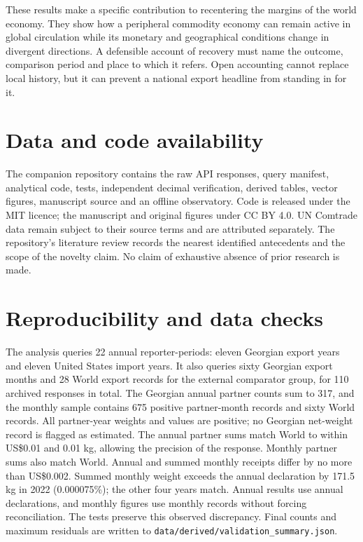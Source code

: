 \documentclass[11pt,a4paper]{article}
\begin{document}
These results make a specific contribution to recentering the margins of the world economy. They show how a peripheral commodity economy can remain active in global circulation while its monetary and geographical conditions change in divergent directions. A defensible account of recovery must name the outcome, comparison period and place to which it refers. Open accounting cannot replace local history, but it can prevent a national export headline from standing in for it.

\section*{Data and code availability}
The companion repository contains the raw API responses, query manifest, analytical code, tests, independent decimal verification, derived tables, vector figures, manuscript source and an offline observatory. Code is released under the MIT licence; the manuscript and original figures under CC BY 4.0. UN Comtrade data remain subject to their source terms and are attributed separately. The repository's literature review records the nearest identified antecedents and the scope of the novelty claim. No claim of exhaustive absence of prior research is made.

\FloatBarrier


\clearpage
\appendix
\section{Reproducibility and data checks}\label{app:validation}
The analysis queries 22 annual reporter-periods: eleven Georgian export years and eleven United States import years. It also queries sixty Georgian export months and 28 World export records for the external comparator group, for 110 archived responses in total. The Georgian annual partner counts sum to 317, and the monthly sample contains 675 positive partner-month records and sixty World records. All partner-year weights and values are positive; no Georgian net-weight record is flagged as estimated. The annual partner sums match World to within US\$0.01 and 0.01 kg, allowing the precision of the response. Monthly partner sums also match World. Annual and summed monthly receipts differ by no more than US\$0.002. Summed monthly weight exceeds the annual declaration by 171.5 kg in 2022 (0.000075\%); the other four years match. Annual results use annual declarations, and monthly figures use monthly records without forcing reconciliation. The tests preserve this observed discrepancy. Final counts and maximum residuals are written to \texttt{data/derived/validation\_summary.json}.
\end{document}

